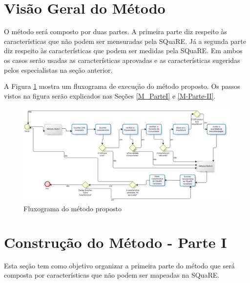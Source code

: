 


\section{Visão Geral do Método}
\label{Visao_Método}

O método será composto por duas partes. A primeira parte diz respeito às características que não podem ser mensuradas pela SQuaRE. Já a segunda parte diz respeito às características que podem ser medidas pela SQuaRE. Em ambos os casos serão usadas  as características aprovadas e as características sugeridas pelos especialistas na seção anterior.

A Figura \ref{fig_VisãoMétodo} mostra um fluxograma de execução do método proposto. Os passos vistos na figura serão explicados  nas Seções \ref{M_ParteI} e \ref{M-Parte-II}.

\begin{landscape}
\begin{figure}[h]
\centering
\includegraphics[keepaspectratio=true,scale=0.85]{figuras/MetodoFluxograma.jpg}
\caption{Fluxograma do método proposto }
\label{fig_VisãoMétodo}
\end{figure}

\end{landscape}



\section{Construção do Método - Parte I}

Esta seção tem como objetivo organizar a primeira parte do método que será composta por características que não podem ser mapeadas na SQuaRE.

